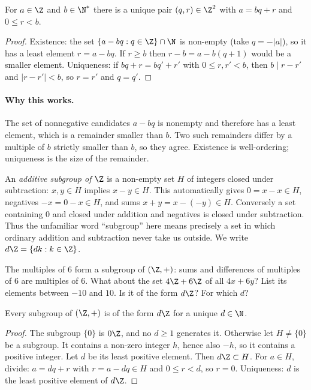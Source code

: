 \begin{theorem}\label{thm:div}
For $a\in\Z$ and $b\in\N^*$ there is a unique pair $(q,r)\in\Z^2$ with $a=bq+r$ and $0\le r<b$.
\end{theorem}
\begin{proof}
Existence: the set $\{a-bq:q\in\Z\}\cap\N$ is non-empty (take $q=-|a|$), so it has a least element $r=a-bq$. If $r\ge b$ then $r-b=a-b(q+1)$ would be a smaller element. Uniqueness: if $bq+r=bq'+r'$ with $0\le r,r'<b$, then $b\mid r-r'$ and $|r-r'|<b$, so $r=r'$ and $q=q'$.
\end{proof}

\paragraph{Why this works.}
The set of nonnegative candidates $a-bq$ is nonempty and therefore has a least element, which is a remainder smaller than $b$. Two such remainders differ by a multiple of $b$ strictly smaller than $b$, so they agree. Existence is well-ordering; uniqueness is the size of the remainder.


An \emph{additive subgroup of $\Z$} is a non-empty set $H$ of integers closed under subtraction: $x,y\in H$ implies $x-y\in H$. This automatically gives $0=x-x\in H$, negatives $-x=0-x\in H$, and sums $x+y=x-(-y)\in H$. Conversely a set containing $0$ and closed under addition and negatives is closed under subtraction. Thus the unfamiliar word ``subgroup'' here means precisely a set in which ordinary addition and subtraction never take us outside. We write $d\Z=\{dk:k\in\Z\}$.

\begin{think}
The multiples of $6$ form a subgroup of $(\Z,+)$: sums and differences of multiples of $6$ are multiples of $6$. What about the set $4\Z+6\Z$ of all $4x+6y$? List its elements between $-10$ and $10$. Is it of the form $d\Z$? For which $d$?
\end{think}

\begin{proposition}\label{prop:subgroups}
Every subgroup of $(\Z,+)$ is of the form $d\Z$ for a unique $d\in\N$.
\end{proposition}
\begin{proof}
The subgroup $\{0\}$ is $0\Z$, and no $d\ge1$ generates it. Otherwise let $H\ne\{0\}$ be a subgroup. It contains a non-zero integer $h$, hence also $-h$, so it contains a positive integer. Let $d$ be its least positive element. Then $d\Z\subset H$. For $a\in H$, divide: $a=dq+r$ with $r=a-dq\in H$ and $0\le r<d$, so $r=0$. Uniqueness: $d$ is the least positive element of $d\Z$.
\end{proof}

